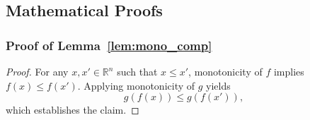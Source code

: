 \documentclass{article}
\theoremstyle{plain}
\theoremstyle{definition}
\theoremstyle{remark}
\begin{document}




\subsection{Mathematical Proofs}
\subsubsection{Proof of Lemma~\ref{lem:mono_comp}}
\label{prf:lem1}
\begin{proof}
For any $x, x' \in \mathbb{R}^n$ such that $x \le x'$, monotonicity of $f$ implies $f(x) \le f(x')$. Applying monotonicity of $g$ yields
\[
g(f(x)) \le g(f(x')),
\]
which establishes the claim.
\end{proof}
\end{document}
